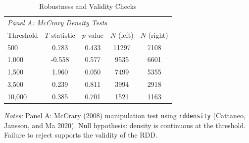 \begin{table}[t]
\centering
\caption{Robustness and Validity Checks}
\label{tab:robustness}
\begin{tabular}{lcccc}
\hline\hline
\multicolumn{5}{l}{\textit{Panel A: McCrary Density Tests}} \\
Threshold & $T$-statistic & $p$-value & $N$ (left) & $N$ (right) \\
\hline
500 & 0.783 & 0.433 & 11297 & 7108 \\
1,000 & -0.558 & 0.577 & 9535 & 6601 \\
1,500 & 1.960 & 0.050 & 7499 & 5355 \\
3,500 & 0.239 & 0.811 & 3994 & 2918 \\
10,000 & 0.385 & 0.701 & 1521 & 1163 \\
\hline\hline
\end{tabular}
\begin{tablenotes}\small
\item \textit{Notes:} Panel A: McCrary (2008) manipulation test using \texttt{rddensity} (Cattaneo, Jansson, and Ma 2020). Null hypothesis: density is continuous at the threshold. Failure to reject supports the validity of the RDD.
\end{tablenotes}
\end{table}
